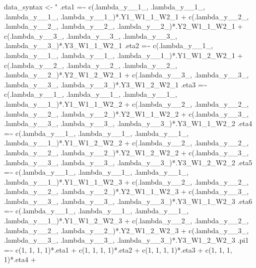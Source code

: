 \documentclass[
]{book}
\newenvironment{Shaded}{\begin{snugshade}}{\end{snugshade}}
\newcommand{\NormalTok}[1]{#1}
\newcommand{\OtherTok}[1]{\textcolor[rgb]{0.56,0.35,0.01}{#1}}
\newcommand{\StringTok}[1]{\textcolor[rgb]{0.31,0.60,0.02}{#1}}
\begin{document}
\begin{Shaded}
\begin{Highlighting}[]
\NormalTok{data\_syntax }\OtherTok{\textless{}{-}} \StringTok{"}
\StringTok{.eta1 =\textasciitilde{}}
\StringTok{    c(.lambda\_y\_\_1\_, .lambda\_y\_\_1\_, .lambda\_y\_\_1\_, .lambda\_y\_\_1\_)*.Y1\_W1\_1\_W2\_1 +}
\StringTok{    c(.lambda\_y\_\_2\_, .lambda\_y\_\_2\_, .lambda\_y\_\_2\_, .lambda\_y\_\_2\_)*.Y2\_W1\_1\_W2\_1 +}
\StringTok{    c(.lambda\_y\_\_3\_, .lambda\_y\_\_3\_, .lambda\_y\_\_3\_, .lambda\_y\_\_3\_)*.Y3\_W1\_1\_W2\_1}
\StringTok{.eta2 =\textasciitilde{}}
\StringTok{    c(.lambda\_y\_\_1\_, .lambda\_y\_\_1\_, .lambda\_y\_\_1\_, .lambda\_y\_\_1\_)*.Y1\_W1\_2\_W2\_1 +}
\StringTok{    c(.lambda\_y\_\_2\_, .lambda\_y\_\_2\_, .lambda\_y\_\_2\_, .lambda\_y\_\_2\_)*.Y2\_W1\_2\_W2\_1 +}
\StringTok{    c(.lambda\_y\_\_3\_, .lambda\_y\_\_3\_, .lambda\_y\_\_3\_, .lambda\_y\_\_3\_)*.Y3\_W1\_2\_W2\_1}
\StringTok{.eta3 =\textasciitilde{}}
\StringTok{    c(.lambda\_y\_\_1\_, .lambda\_y\_\_1\_, .lambda\_y\_\_1\_, .lambda\_y\_\_1\_)*.Y1\_W1\_1\_W2\_2 +}
\StringTok{    c(.lambda\_y\_\_2\_, .lambda\_y\_\_2\_, .lambda\_y\_\_2\_, .lambda\_y\_\_2\_)*.Y2\_W1\_1\_W2\_2 +}
\StringTok{    c(.lambda\_y\_\_3\_, .lambda\_y\_\_3\_, .lambda\_y\_\_3\_, .lambda\_y\_\_3\_)*.Y3\_W1\_1\_W2\_2}
\StringTok{.eta4 =\textasciitilde{}}
\StringTok{    c(.lambda\_y\_\_1\_, .lambda\_y\_\_1\_, .lambda\_y\_\_1\_, .lambda\_y\_\_1\_)*.Y1\_W1\_2\_W2\_2 +}
\StringTok{    c(.lambda\_y\_\_2\_, .lambda\_y\_\_2\_, .lambda\_y\_\_2\_, .lambda\_y\_\_2\_)*.Y2\_W1\_2\_W2\_2 +}
\StringTok{    c(.lambda\_y\_\_3\_, .lambda\_y\_\_3\_, .lambda\_y\_\_3\_, .lambda\_y\_\_3\_)*.Y3\_W1\_2\_W2\_2}
\StringTok{.eta5 =\textasciitilde{}}
\StringTok{    c(.lambda\_y\_\_1\_, .lambda\_y\_\_1\_, .lambda\_y\_\_1\_, .lambda\_y\_\_1\_)*.Y1\_W1\_1\_W2\_3 +}
\StringTok{    c(.lambda\_y\_\_2\_, .lambda\_y\_\_2\_, .lambda\_y\_\_2\_, .lambda\_y\_\_2\_)*.Y2\_W1\_1\_W2\_3 +}
\StringTok{    c(.lambda\_y\_\_3\_, .lambda\_y\_\_3\_, .lambda\_y\_\_3\_, .lambda\_y\_\_3\_)*.Y3\_W1\_1\_W2\_3}
\StringTok{.eta6 =\textasciitilde{}}
\StringTok{    c(.lambda\_y\_\_1\_, .lambda\_y\_\_1\_, .lambda\_y\_\_1\_, .lambda\_y\_\_1\_)*.Y1\_W1\_2\_W2\_3 +}
\StringTok{    c(.lambda\_y\_\_2\_, .lambda\_y\_\_2\_, .lambda\_y\_\_2\_, .lambda\_y\_\_2\_)*.Y2\_W1\_2\_W2\_3 +}
\StringTok{    c(.lambda\_y\_\_3\_, .lambda\_y\_\_3\_, .lambda\_y\_\_3\_, .lambda\_y\_\_3\_)*.Y3\_W1\_2\_W2\_3}
\StringTok{.pi1 =\textasciitilde{}}
\StringTok{    c(1, 1, 1, 1)*.eta1 +}
\StringTok{    c(1, 1, 1, 1)*.eta2 +}
\StringTok{    c(1, 1, 1, 1)*.eta3 +}
\StringTok{    c(1, 1, 1, 1)*.eta4 +}

\end{Highlighting}
\end{Shaded}
\end{document}
